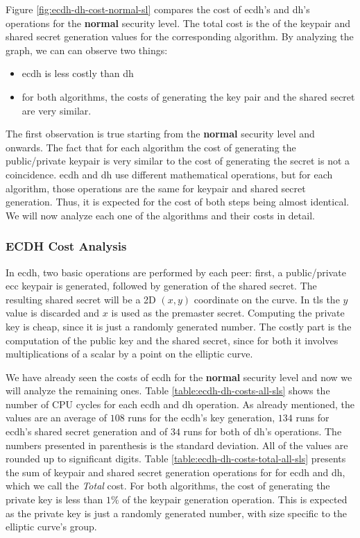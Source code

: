 Figure \ref{fig:ecdh-dh-cost-normal-sl} compares the cost of \gls{ecdh}'s and \gls{dh}'s operations for the \textbf{normal} security level.
The total cost is the of the keypair and shared secret generation values for the corresponding algorithm. By analyzing the graph, we can can
observe two things:

\begin{itemize}
  \item \gls{ecdh} is less costly than \gls{dh}
  \item for both algorithms, the costs of generating the key pair and the shared secret are very similar.
\end{itemize}

The first observation is true starting from the \textbf{normal} security level and onwards.
The fact that for each algorithm the cost of generating the public/private keypair is very similar to the cost of generating the secret is not a coincidence.
\gls{ecdh} and \gls{dh} use different mathematical operations, but for each algorithm, those operations are the same for keypair and
shared secret generation. Thus, it is expected for the cost of both steps being almost identical. We will now analyze each one of the algorithms and
their costs in detail.

\subsubsection{ECDH Cost Analysis}

In \gls{ecdh}, two basic operations are performed by each peer: first, a public/private \gls{ecc} keypair is generated, followed by generation of
the shared secret. The resulting shared secret will be a 2D $(x,y)$ coordinate on the curve. In \gls{tls} the $y$ value is discarded and $x$ is
used as the premaster secret. Computing the private key is cheap, since it is just a randomly generated number. The costly part is the computation of
the public key and the shared secret, since for both it involves multiplications of a scalar by a point on the elliptic curve.

We have already seen the costs of \gls{ecdh} for the \textbf{normal} security level and now we will analyze the remaining ones. Table
\ref{table:ecdh-dh-costs-all-sls} shows the number of CPU cycles for each \gls{ecdh} and \gls{dh} operation. As already mentioned, the values are
an average of $108$ runs for the \gls{ecdh}'s key generation, $134$ runs for \gls{ecdh}'s shared secret generation and of $34$ runs for both of \gls{dh}'s
operations. The numbers presented in parenthesis is the standard deviation. All of the values are rounded up to significant digits.
Table \ref{table:ecdh-dh-costs-total-all-sls} presents the sum of keypair and shared secret generation operations for for \gls{ecdh} and \gls{dh},
which we call the \textit{Total} cost. For both algorithms, the cost of generating the private key is less than $1\%$ of the keypair generation operation.
This is expected as the private key is just a randomly generated number, with size specific to the elliptic curve's group.

